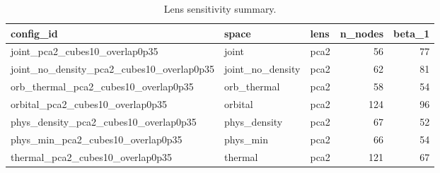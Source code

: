 \begin{table}[p]
\centering
\caption{Lens sensitivity summary.}
\label{tab:mapper_lens_sensitivity}
\begin{adjustbox}{max width=\linewidth}
\begin{tabular}{lllrr}
\toprule
config\_id & space & lens & n\_nodes & beta\_1 \\
\midrule
joint\_pca2\_cubes10\_overlap0p35 & joint & pca2 & 56 & 77 \\
joint\_no\_density\_pca2\_cubes10\_overlap0p35 & joint\_no\_density & pca2 & 62 & 81 \\
orb\_thermal\_pca2\_cubes10\_overlap0p35 & orb\_thermal & pca2 & 58 & 54 \\
orbital\_pca2\_cubes10\_overlap0p35 & orbital & pca2 & 124 & 96 \\
phys\_density\_pca2\_cubes10\_overlap0p35 & phys\_density & pca2 & 67 & 52 \\
phys\_min\_pca2\_cubes10\_overlap0p35 & phys\_min & pca2 & 66 & 54 \\
thermal\_pca2\_cubes10\_overlap0p35 & thermal & pca2 & 121 & 67 \\
\bottomrule
\end{tabular}
\end{adjustbox}
\end{table}
